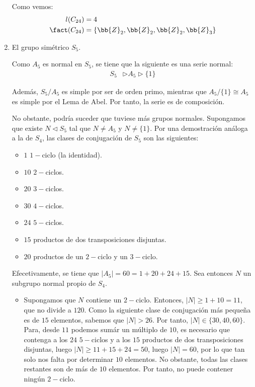 \begin{ejercicio}
\begin{enumerate}
        Como vemos:
        \begin{align*}
            l(C_{24}) &= 4 \\
            \fact(C_{24}) &= \{\bb{Z}_2, \bb{Z}_2, \bb{Z}_2, \bb{Z}_3\}
        \end{align*}

        \item El grupo simétrico $S_5$.
        
        Como $A_5$ es normal en $S_5$, se tiene que la siguiente es una serie normal:
        \begin{align*}
            S_5 &\rhd A_5 \rhd \{1\}
        \end{align*}

        Además, $S_5/A_5$ es simple por ser de orden primo, mientras que $A_5/\{1\}\cong A_5$ es simple por el Lema de Abel. Por tanto, la serie es de composición.

        No obstante, podría suceder que tuviese más grupos normales. Supongamos que existe $N\lhd S_5$ tal que $N\neq A_5$ y $N\neq \{1\}$. Por una demostración análoga a la de $S_4$, las clases de conjugación de $S_5$ son las siguientes:
        \begin{itemize}
            \item $1$ $1-$ciclo (la identidad).
            \item $10$ $2-$ciclos.
            \item $20$ $3-$ciclos.
            \item $30$ $4-$ciclos.
            \item $24$ $5-$ciclos.
            \item $15$ productos de dos transposiciones disjuntas.
            \item $20$ productos de un $2-$ciclo y un $3-$ciclo.
        \end{itemize}

        Efecetivamente, se tiene que $|A_5|=60=1+20+24+15$. Sea entonces $N$ un subgrupo normal propio de $S_4$.
        \begin{itemize}
            \item Supongamos que $N$ contiene un $2-$ciclo. Entonces, $|N|\geq 1+10=11$, que no divide a $120$. Como la siguiente clase de conjugación más pequeña es de $15$ elementos, sabemos que $|N|>26$. Por tanto, $|N|\in \{30,40,60\}$. Para, desde $11$ podemos sumár un múltiplo de $10$, es necesario que contenga a los $24$ $5-$ciclos y a los $15$ productos de dos transposiciones disjuntas, luego $|N|\geq 11+15+24=50$, luego $|N|=60$, por lo que tan solo nos falta por determinar $10$ elementos. No obstante, todas las clases restantes son de más de $10$ elementos. Por tanto, no puede contener ningún $2-$ciclo.
            

\end{itemize}
\end{enumerate}
\end{ejercicio}
